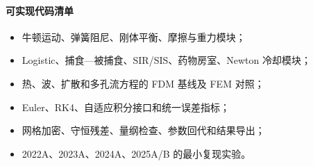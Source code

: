 \paragraph{可实现代码清单}
\begin{itemize}
  \item 牛顿运动、弹簧阻尼、刚体平衡、摩擦与重力模块；
  \item Logistic、捕食—被捕食、SIR/SIS、药物房室、Newton 冷却模块；
  \item 热、波、扩散和多孔流方程的 FDM 基线及 FEM 对照；
  \item Euler、RK4、自适应积分接口和统一误差指标；
  \item 网格加密、守恒残差、量纲检查、参数回代和结果导出；
  \item 2022A、2023A、2024A、2025A/B 的最小复现实验。
\end{itemize}

